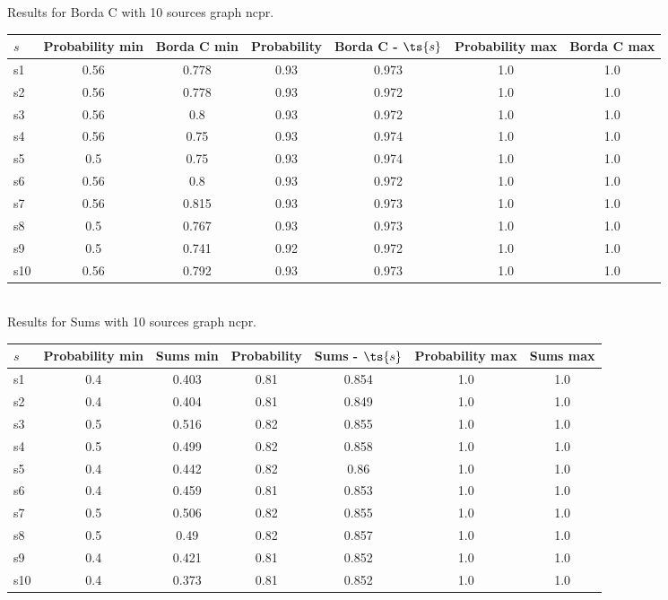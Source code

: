 \documentclass{article}
\begin{document}
\noindent Results for Borda C with 10 sources graph ncpr.

\noindent\begin{tabular}{|l|c|c|c|c|c|c|}
\hline
$s$& Probability min & Borda C min & Probability & Borda C - $\ts{s}$ & Probability max & Borda C max\\
\hline
s1 &0.56 & 0.778 & 0.93 & 0.973 & 1.0 & 1.0\\
\hline
s2 &0.56 & 0.778 & 0.93 & 0.972 & 1.0 & 1.0\\
\hline
s3 &0.56 & 0.8 & 0.93 & 0.972 & 1.0 & 1.0\\
\hline
s4 &0.56 & 0.75 & 0.93 & 0.974 & 1.0 & 1.0\\
\hline
s5 &0.5 & 0.75 & 0.93 & 0.974 & 1.0 & 1.0\\
\hline
s6 &0.56 & 0.8 & 0.93 & 0.972 & 1.0 & 1.0\\
\hline
s7 &0.56 & 0.815 & 0.93 & 0.973 & 1.0 & 1.0\\
\hline
s8 &0.5 & 0.767 & 0.93 & 0.973 & 1.0 & 1.0\\
\hline
s9 &0.5 & 0.741 & 0.92 & 0.972 & 1.0 & 1.0\\
\hline
s10 &0.56 & 0.792 & 0.93 & 0.973 & 1.0 & 1.0\\
\hline
\end{tabular}\\

\noindent Results for Sums with 10 sources graph ncpr.

\noindent\begin{tabular}{|l|c|c|c|c|c|c|}
\hline
$s$& Probability min & Sums min & Probability & Sums - $\ts{s}$ & Probability max & Sums max\\
\hline
s1 &0.4 & 0.403 & 0.81 & 0.854 & 1.0 & 1.0\\
\hline
s2 &0.4 & 0.404 & 0.81 & 0.849 & 1.0 & 1.0\\
\hline
s3 &0.5 & 0.516 & 0.82 & 0.855 & 1.0 & 1.0\\
\hline
s4 &0.5 & 0.499 & 0.82 & 0.858 & 1.0 & 1.0\\
\hline
s5 &0.4 & 0.442 & 0.82 & 0.86 & 1.0 & 1.0\\
\hline
s6 &0.4 & 0.459 & 0.81 & 0.853 & 1.0 & 1.0\\
\hline
s7 &0.5 & 0.506 & 0.82 & 0.855 & 1.0 & 1.0\\
\hline
s8 &0.5 & 0.49 & 0.82 & 0.857 & 1.0 & 1.0\\
\hline
s9 &0.4 & 0.421 & 0.81 & 0.852 & 1.0 & 1.0\\
\hline
s10 &0.4 & 0.373 & 0.81 & 0.852 & 1.0 & 1.0\\
\hline
\end{tabular}\\
\end{document}
